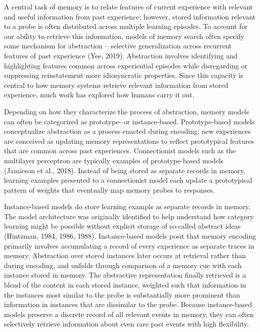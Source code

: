 \documentclass[
  letterpaper,
]{article}
\begin{document}
A central task of memory is to relate features of current experience
with relevant and useful information from past experience; however,
stored information relevant to a probe is often distributed across
multiple learning episodes. To account for our ability to retrieve this
information, models of memory search often specify some mechanism for
abstraction -- selective generalization across recurrent features of
past experience (Yee, 2019). Abstraction involves identifying and
highlighting features common across experiential episodes while
disregarding or suppressing reinstatement more idiosyncratic properties.
Since this capacity is central to how memory systems retrieve relevant
information from stored experience, much work has explored how humans
carry it out.

Depending on how they characterize the process of abstraction, memory
models can often be categorized as prototype- or instance-based.
Prototype-based models conceptualize abstraction as a process enacted
during encoding; new experiences are conceived as updating memory
representations to reflect prototypical features that are common across
past experiences. Connectionist models such as the multilayer perceptron
are typically examples of prototype-based models (Jamieson et al.,
2018). Instead of being stored as separate records in memory, learning
examples presented to a connectionist model each update a prototypical
pattern of weights that eventually map memory probes to responses.

Instance-based models do store learning exampls as separate records in
memory. The model architecture was originally identified to help
understand how category learning might be possible without explicit
storage of so-called abstract ideas (Hintzman, 1984, 1986, 1988).
Instance-based models posit that memory encoding primarily involves
accumulating a record of every experience as separate traces in memory.
Abstraction over stored instances later occurs at retrieval rather than
during encoding, and unfolds through comparison of a memory cue with
each instance stored in memory. The abstractive representation finally
retrieved is a blend of the content in each stored instance, weighted
such that information in the instances most similar to the probe is
substantially more prominent than information in instances that are
dissimilar to the probe. Because instance-based models preserve a
discrete record of all relevant events in memory, they can often
selectively retrieve information about even rare past events with high
flexibility.
\end{document}
